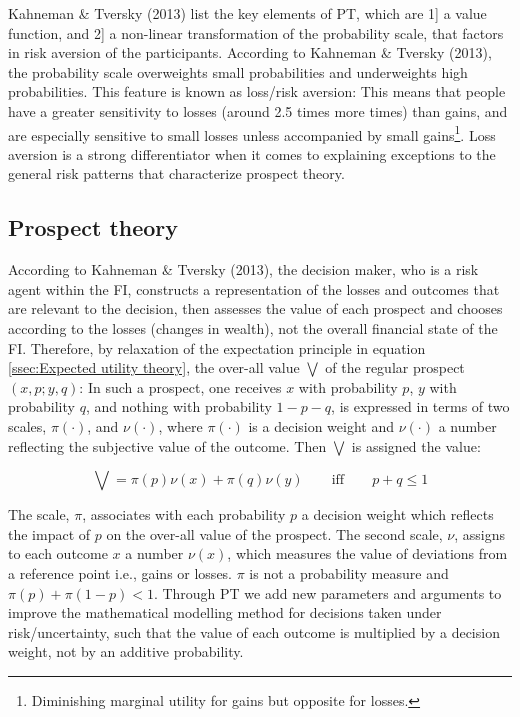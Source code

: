 \documentclass{DissertateUSU}
\begin{document}
Kahneman \& Tversky (2013) list the key elements of PT, which are 1{]} a
value function, and 2{]} a non-linear transformation of the probability
scale, that factors in risk aversion of the participants. According to
Kahneman \& Tversky (2013), the probability scale overweights small
probabilities and underweights high probabilities. This feature is known
as loss/risk aversion: This means that people have a greater sensitivity
to losses (around 2.5 times more times) than gains, and are especially
sensitive to small losses unless accompanied by small
gains\footnote{Diminishing marginal utility for gains but opposite for losses.}.
Loss aversion is a strong differentiator when it comes to explaining
exceptions to the general risk patterns that characterize prospect
theory.\medskip

\subsection{Prospect theory}
\label{ssec:Prospect theory}

According to Kahneman \& Tversky (2013), the decision maker, who is a
risk agent within the FI, constructs a representation of the losses and
outcomes that are relevant to the decision, then assesses the value of
each prospect and chooses according to the losses (changes in wealth),
not the overall financial state of the FI. Therefore, by relaxation of
the expectation principle in equation
\ref{ssec:Expected utility theory}, the over-all value
\(\mathbf{\bigvee}\) of the regular prospect \((x,p;y,q)\): In such a
prospect, one receives \(x\) with probability \(p\), \(y\) with
probability \(q\), and nothing with probability \(1-p-q\), is expressed
in terms of two scales, \(\pi(\cdot)\), and \(\nu(\cdot)\), where
\(\pi(\cdot)\) is a decision weight and \(\nu(\cdot)\) a number
reflecting the subjective value of the outcome. Then
\(\mathbf{\bigvee}\) is assigned the value:

\begin{equation}\label{eqn2}
\mathbf{\bigvee}=\pi(p)\nu(x)+\pi(q)\nu(y) \qquad\mbox{iff} \qquad p+q \leq 1
\end{equation}

The scale, \(\pi\), associates with each probability \(p\) a decision
weight which reflects the impact of \(p\) on the over-all value of the
prospect. The second scale, \(\nu\), assigns to each outcome \(x\) a
number \(\nu(x)\), which measures the value of deviations from a
reference point i.e., gains or losses. \(\pi\) is not a probability
measure and \(\pi(p) + \pi(1-p) < 1\). Through PT we add new parameters
and arguments to improve the mathematical modelling method for decisions
taken under risk/uncertainty, such that the value of each outcome is
multiplied by a decision weight, not by an additive probability.\medskip
\end{document}
